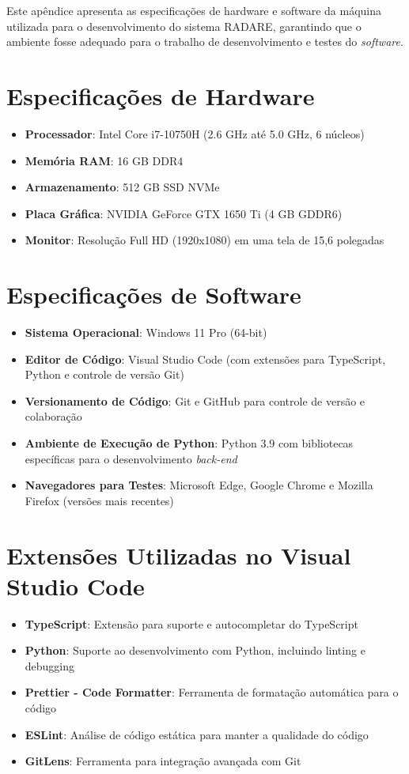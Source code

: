 \label{Ap:configuracaoMaquina}

Este apêndice apresenta as especificações de hardware e software da máquina utilizada para o desenvolvimento do sistema RADARE, garantindo que o ambiente fosse adequado para o trabalho de desenvolvimento e testes do \textit{software}.

\section{Especificações de Hardware}
\begin{itemize}
    \item \textbf{Processador}: Intel Core i7-10750H (2.6 GHz até 5.0 GHz, 6 núcleos)
    \item \textbf{Memória RAM}: 16 GB DDR4
    \item \textbf{Armazenamento}: 512 GB SSD NVMe
    \item \textbf{Placa Gráfica}: NVIDIA GeForce GTX 1650 Ti (4 GB GDDR6)
    \item \textbf{Monitor}: Resolução Full HD (1920x1080) em uma tela de 15,6 polegadas
\end{itemize}

\section{Especificações de Software}
\begin{itemize}
    \item \textbf{Sistema Operacional}: Windows 11 Pro (64-bit)
    \item \textbf{Editor de Código}: Visual Studio Code (com extensões para TypeScript, Python e controle de versão Git)
    \item \textbf{Versionamento de Código}: Git e GitHub para controle de versão e colaboração
    \item \textbf{Ambiente de Execução de Python}: Python 3.9 com bibliotecas específicas para o desenvolvimento \textit{back-end}
    \item \textbf{Navegadores para Testes}: Microsoft Edge, Google Chrome e Mozilla Firefox (versões mais recentes)
\end{itemize}

\section{Extensões Utilizadas no Visual Studio Code}
\begin{itemize}
    \item \textbf{TypeScript}: Extensão para suporte e autocompletar do TypeScript
    \item \textbf{Python}: Suporte ao desenvolvimento com Python, incluindo linting e debugging
    \item \textbf{Prettier - Code Formatter}: Ferramenta de formatação automática para o código
    \item \textbf{ESLint}: Análise de código estática para manter a qualidade do código
    \item \textbf{GitLens}: Ferramenta para integração avançada com Git
\end{itemize}

